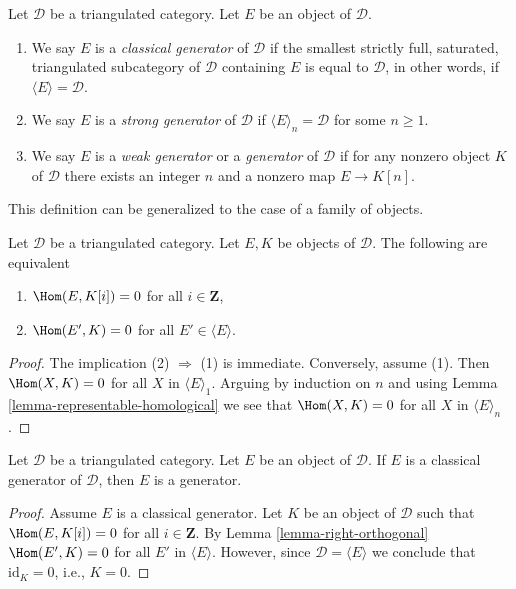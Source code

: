 \begin{definition}
\label{definition-generators}
Let $\mathcal{D}$ be a triangulated category. Let $E$ be an object
of $\mathcal{D}$.
\begin{enumerate}
\item We say $E$ is a {\it classical generator} of $\mathcal{D}$
if the smallest strictly full, saturated, triangulated subcategory
of $\mathcal{D}$ containing $E$ is equal to $\mathcal{D}$, in
other words, if $\langle E \rangle = \mathcal{D}$.
\item We say $E$ is a {\it strong generator} of $\mathcal{D}$
if $\langle E \rangle_n = \mathcal{D}$ for some $n \geq 1$.
\item We say $E$ is a {\it weak generator} or a {\it generator}
of $\mathcal{D}$
if for any nonzero object $K$ of $\mathcal{D}$ there exists
an integer $n$ and a nonzero map $E \to K[n]$.
\end{enumerate}
\end{definition}

\noindent
This definition can be generalized to the case of a family of objects.

\begin{lemma}
\label{lemma-right-orthogonal}
Let $\mathcal{D}$ be a triangulated category. Let $E, K$ be objects
of $\mathcal{D}$. The following are equivalent
\begin{enumerate}
\item $\Hom(E, K[i]) = 0$ for all $i \in \mathbf{Z}$,
\item $\Hom(E', K) = 0$ for all $E' \in \langle E \rangle$.
\end{enumerate}
\end{lemma}

\begin{proof}
The implication (2) $\Rightarrow$ (1) is immediate. Conversely,
assume (1). Then $\Hom(X, K) = 0$ for all $X$ in $\langle E \rangle_1$.
Arguing by induction on $n$ and using
Lemma \ref{lemma-representable-homological}
we see that $\Hom(X, K) = 0$ for all $X$
in $\langle E \rangle_n$.
\end{proof}

\begin{lemma}
\label{lemma-classical-generator-generator}
Let $\mathcal{D}$ be a triangulated category. Let $E$ be an object
of $\mathcal{D}$. If $E$ is a classical generator of $\mathcal{D}$,
then $E$ is a generator.
\end{lemma}

\begin{proof}
Assume $E$ is a classical generator. Let $K$ be an object of $\mathcal{D}$
such that $\Hom(E, K[i]) = 0$ for all $i \in \mathbf{Z}$. By
Lemma \ref{lemma-right-orthogonal}
$\Hom(E', K) = 0$ for all $E'$ in $\langle E \rangle$. However, since
$\mathcal{D} = \langle E \rangle$ we conclude that $\text{id}_K = 0$,
i.e., $K = 0$.
\end{proof}

